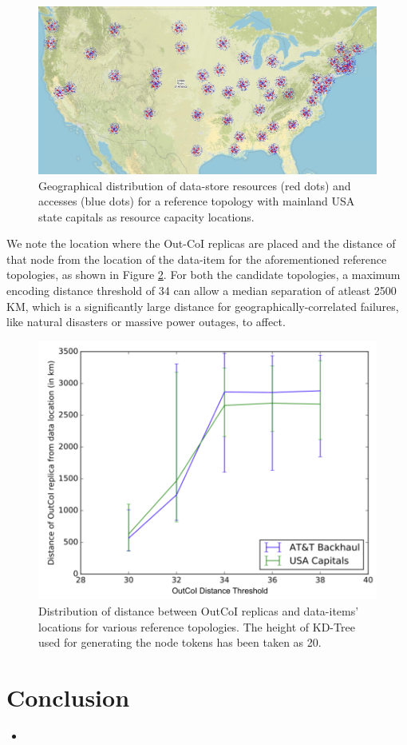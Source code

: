 \begin{figure}[h]
\centering
\includegraphics[width=0.75\columnwidth]{figures/fogstore/evals/fault-tolerance/map_accesses.jpg}
\caption{Geographical distribution of data-store resources (red dots) and accesses (blue dots) for a reference topology with mainland USA state capitals as resource capacity locations.}
\label{fig:faultToleranceTopo}
\end{figure}
We note the location where the Out-CoI replicas are placed and the distance of that node from the location of the data-item for the aforementioned reference topologies, as shown in Figure \ref{fig:outCoiDistance}. For both the candidate topologies, a maximum encoding distance threshold of 34 can allow a median separation of atleast 2500 KM, which is a significantly large distance for geographically-correlated failures, like natural disasters or massive power outages, to affect.
\begin{figure}[h]
\centering
\includegraphics[width=0.75\columnwidth]{figures/fogstore/evals/fault-tolerance/outCoiDist.png}
\caption{Distribution of distance between OutCoI replicas and data-items' locations for various reference topologies. The height of KD-Tree used for generating the node tokens has been taken as 20.}
\label{fig:outCoiDistance}
\end{figure}

\section{Conclusion}
\label{sec:conclusion}
\begin{itemize}
\item 
\end{itemize}